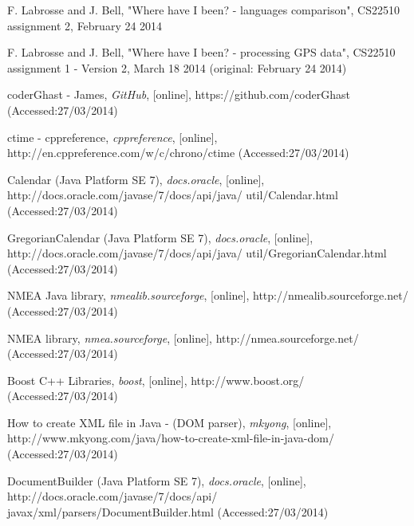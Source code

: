 \documentclass{article}
\begin{document}
\begin{thebibliography}{10}

 F. Labrosse and J. Bell, "Where have I been? - languages comparison", CS22510 assignment 2, February 24 2014

 F. Labrosse and J. Bell, "Where have I been? - processing GPS data", CS22510 assignment 1 - Version 2, March 18 2014 (original: February 24 2014)

 coderGhast - James, {\em GitHub}, [online], https://github.com/coderGhast (Accessed:27/03/2014)

 ctime - cppreference, {\em cppreference}, [online], http://en.cppreference.com/w/c/chrono/ctime (Accessed:27/03/2014)

 Calendar (Java Platform SE 7), {\em docs.oracle}, [online], http://docs.oracle.com/javase/7/docs/api/java/ util/Calendar.html (Accessed:27/03/2014)

 GregorianCalendar (Java Platform SE 7), {\em docs.oracle}, [online], http://docs.oracle.com/javase/7/docs/api/java/ util/GregorianCalendar.html (Accessed:27/03/2014)

 NMEA Java library, {\em nmealib.sourceforge}, [online], http://nmealib.sourceforge.net/ (Accessed:27/03/2014)

 NMEA library, {\em nmea.sourceforge}, [online], http://nmea.sourceforge.net/ (Accessed:27/03/2014)

 Boost C++ Libraries, {\em boost}, [online], http://www.boost.org/ (Accessed:27/03/2014)

 How to create XML file in Java - (DOM parser), {\em mkyong}, [online], http://www.mkyong.com/java/how-to-create-xml-file-in-java-dom/ (Accessed:27/03/2014)

 DocumentBuilder (Java Platform SE 7), {\em docs.oracle}, [online], http://docs.oracle.com/javase/7/docs/api/ javax/xml/parsers/DocumentBuilder.html (Accessed:27/03/2014)

\end{thebibliography}
\end{document}
